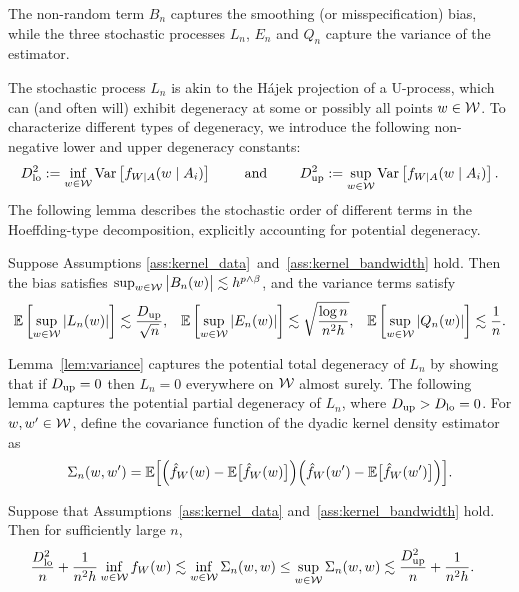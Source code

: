 The non-random term $B_n$ captures the smoothing (or misspecification) bias,
while the three stochastic processes $L_n$, $E_n$ and $Q_n$
capture the variance of the estimator.

The stochastic process $L_n$ is akin to the H\'{a}jek projection of a U-process,
which can (and often will) exhibit degeneracy at some
or possibly all points $w \in \mathcal{W}$.
To characterize different types of degeneracy,
we introduce the following non-negative lower and upper degeneracy constants:
%
\[
  D_{\textup{lo}}^2 := \inf_{w \in \mathcal{W}} \operatorname{Var}\left[f_{W \mid A}(w \mid A_i)\right]
  \qquad \text{ and } \qquad
  D_{\textup{up}}^2 := \sup_{w \in \mathcal{W}} \operatorname{Var}\left[f_{W \mid A}(w \mid A_i)\right].
\]
%
The following lemma describes the stochastic order of
different terms in the Hoeffding-type decomposition,
explicitly accounting for potential degeneracy.

\begin{lemma} \label{lem:variance}
  Suppose Assumptions \ref{ass:kernel_data}~and~\ref{ass:kernel_bandwidth}
  hold. Then the bias satisfies
  $\sup_{w \in \mathcal{W}} \big| B_n(w) \big| \lesssim h^{p\wedge\beta}$,
  and the variance terms satisfy
  \begin{align*}
    \mathbb{E}\left[ \sup_{w \in \mathcal{W}} |L_n(w)| \right]
    &\lesssim
    \frac{D_{\textup{up}}}{\sqrt n},
    &
    \mathbb{E}\left[ \sup_{w \in \mathcal{W}} |E_n(w)| \right]
    &\lesssim \sqrt{\frac{\log n}{n^2h}},
    &
    \mathbb{E}\left[ \sup_{w \in \mathcal{W}} |Q_n(w)| \right]
    \lesssim \frac{1}{n}.
  \end{align*}
\end{lemma}

Lemma~\ref{lem:variance} captures the potential total degeneracy of $L_n$ by
showing that if
$D_{\textup{up}}=0$ then $L_n=0$ everywhere on $\mathcal{W}$ almost surely.
The following lemma
captures the potential partial degeneracy of $L_n$, where
$D_{\textup{up}} > D_{\textup{lo}} = 0$.
For $w,w' \in \mathcal{W}$,
define the covariance function of the dyadic kernel density estimator as
%
\begin{equation*}
  \Sigma_n(w,w')
  =
  \mathbb{E}\Big[
    \Big(
      \hat f_W(w)
      - \mathbb{E}\big[\hat f_W(w)\big]
    \Big)
    \Big(
      \hat f_W(w')
      - \mathbb{E}\big[\hat f_W(w')\big]
    \Big)
  \Big].
\end{equation*}
%
\begin{lemma}
  \label{lem:variance_bounds}
  Suppose that Assumptions~\ref{ass:kernel_data}
  and~\ref{ass:kernel_bandwidth} hold.
  Then for sufficiently large $n$,
  \begin{align*}
    \frac{D_{\textup{lo}}^2}{n} + \frac{1}{n^2h}
    \inf_{w \in \mathcal{W}} f_W(w)
    &\lesssim
    \inf_{w \in \mathcal{W}} \Sigma_n(w,w)
    \leq
    \sup_{w \in \mathcal{W}} \Sigma_n(w,w)
    \lesssim
    \frac{D_{\textup{up}}^2}{n} + \frac{1}{n^2h}.
  \end{align*}
\end{lemma}

